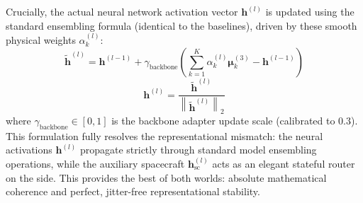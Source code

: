 Crucially, the actual neural network activation vector $\mathbf{h}^{(l)}$ is updated using the standard ensembling formula (identical to the baselines), driven by these smooth physical weights $\alpha_k^{(l)}$:
\vspace{-3pt}
\begin{equation}
    \tilde{\mathbf{h}}^{(l)} = \mathbf{h}^{(l-1)} + \gamma_{\text{backbone}} \left( \sum_{k=1}^K \alpha_k^{(l)} \boldsymbol{\mu}_k^{(3)} - \mathbf{h}^{(l-1)} \right)
    \label{eq:activation_blend}
\end{equation}
\vspace{-3pt}
\begin{equation}
    \mathbf{h}^{(l)} = \frac{\tilde{\mathbf{h}}^{(l)}}{\left\| \tilde{\mathbf{h}}^{(l)} \right\|_2}
    \label{eq:activation_normalization}
\end{equation}
\vspace{-3pt}
where $\gamma_{\text{backbone}} \in [0, 1]$ is the backbone adapter update scale (calibrated to $0.3$). This formulation fully resolves the representational mismatch: the neural activations $\mathbf{h}^{(l)}$ propagate strictly through standard model ensembling operations, while the auxiliary spacecraft $\mathbf{h}_{\text{sc}}^{(l)}$ acts as an elegant stateful router on the side. This provides the best of both worlds: absolute mathematical coherence and perfect, jitter-free representational stability.
